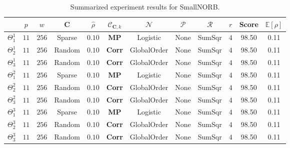 \documentclass[12pt,a4paper,oneside,english]{UPBThesis}
\begin{document}
\renewcommand{\arraystretch}{1.2}
\begin{table}
  \caption{Summarized experiment results for SmallNORB.}
  \label{table:RecoderEvNORBSmallResultsSummarized}
  \begin{tabularx}{\textwidth}{|R|c|c|c|c|c|c|c|c|c|c|c|}
    \hline
    & $p$ & $w$ & $\textbf{C}$ & $\hat{\rho}$ & $\mathcal{C}_{\textbf{C},k}$ & $\mathcal{N}$ & $\mathcal{P}$ & $\mathcal{R}$ & $r$ & Score & $\mathbb{E}[\rho]$ \tabularnewline\hline\hline
    $\Theta_1^1$ & $11$ & $256$ & Sparse & $0.10$ & \textbf{MP} & Logistic & None & SumSqr & $4$ & 98.50 & 0.11 \tabularnewline\hline
    $\Theta_2^1$ & $11$ & $256$ & Random & $0.10$ & \textbf{Corr} & GlobalOrder & None & SumSqr & $4$ & 98.50 & 0.11 \tabularnewline\hline
    $\Theta_3^1$ & $11$ & $256$ & Random & $0.10$ & \textbf{Corr} & GlobalOrder & None & SumSqr & $4$ & 98.50 & 0.11 \tabularnewline\hline\hline
    $\Theta_1^2$ & $11$ & $256$ & Sparse & $0.10$ & \textbf{MP} & Logistic & None & SumSqr & $4$ & 98.50 & 0.11 \tabularnewline\hline
    $\Theta_2^2$ & $11$ & $256$ & Random & $0.10$ & \textbf{Corr} & GlobalOrder & None & SumSqr & $4$ & 98.50 & 0.11 \tabularnewline\hline
    $\Theta_3^2$ & $11$ & $256$ & Random & $0.10$ & \textbf{Corr} & GlobalOrder & None & SumSqr & $4$ & 98.50 & 0.11 \tabularnewline\hline\hline
    $\Theta_1^3$ & $11$ & $256$ & Sparse & $0.10$ & \textbf{MP} & Logistic & None & SumSqr & $4$ & 98.50 & 0.11 \tabularnewline\hline
    $\Theta_2^3$ & $11$ & $256$ & Random & $0.10$ & \textbf{Corr} & GlobalOrder & None & SumSqr & $4$ & 98.50 & 0.11 \tabularnewline\hline
    $\Theta_3^3$ & $11$ & $256$ & Random & $0.10$ & \textbf{Corr} & GlobalOrder & None & SumSqr & $4$ & 98.50 & 0.11 \tabularnewline
    \hline
  \end{tabularx}
\end{table}
\renewcommand{\arraystretch}{1.0}
\end{document}
